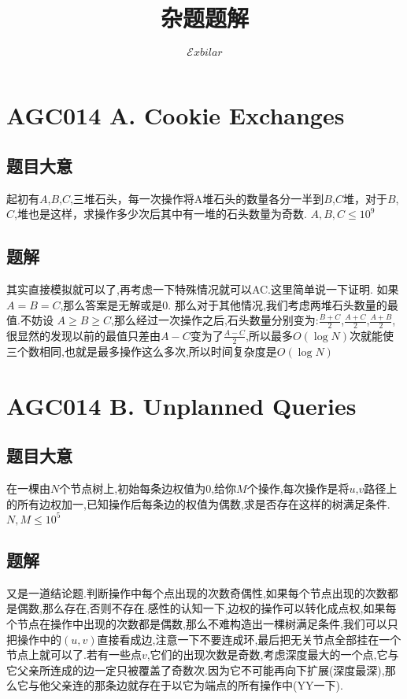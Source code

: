 \documentclass[]{article}
\date{}
\title{杂题题解}
\author{$\mathcal Exbilar$}
\begin{document}
\maketitle

\section{AGC014 A. Cookie Exchanges}

\subsection{题目大意}

起初有$A$,$B$,$C$,三堆石头，每一次操作将A堆石头的数量各分一半到$B$,$C$堆，对于$B$,$C$,堆也是这样，求操作多少次后其中有一堆的石头数量为奇数. $A,B,C \le { 10 }^{ 9 }$

\subsection{题解}

其实直接模拟就可以了,再考虑一下特殊情况就可以AC.这里简单说一下证明.
如果$A=B=C$,那么答案是无解或是0.
那么对于其他情况,我们考虑两堆石头数量的最值.不妨设 $A \ge B \ge C$,那么经过一次操作之后,石头数量分别变为:$\frac { B + C }{2}$,$\frac { A + C }{2}$,$\frac { A + B }{2}$,很显然的发现以前的最值只差由$A-C$变为了$\frac {A - C}{2}$,所以最多$O(\log{N})$次就能使三个数相同,也就是最多操作这么多次,所以时间复杂度是$O({\log {N}})$ 

\newpage

\section{AGC014 B. Unplanned Queries}

\subsection{题目大意}

在一棵由$N$个节点树上,初始每条边权值为$0$,给你$M$个操作,每次操作是将$u$,$v$路径上的所有边权加一,已知操作后每条边的权值为偶数,求是否存在这样的树满足条件. $N,M \le {10}^{5}$

\subsection{题解}

又是一道结论题.判断操作中每个点出现的次数奇偶性,如果每个节点出现的次数都是偶数,那么存在,否则不存在.感性的认知一下,边权的操作可以转化成点权,如果每个节点在操作中出现的次数都是偶数,那么不难构造出一棵树满足条件,我们可以只把操作中的$(u,v)$直接看成边,注意一下不要连成环,最后把无关节点全部挂在一个节点上就可以了.若有一些点$v$,它们的出现次数是奇数,考虑深度最大的一个点,它与它父亲所连成的边一定只被覆盖了奇数次.因为它不可能再向下扩展(深度最深),那么它与他父亲连的那条边就存在于以它为端点的所有操作中(YY一下).
\end{document}
